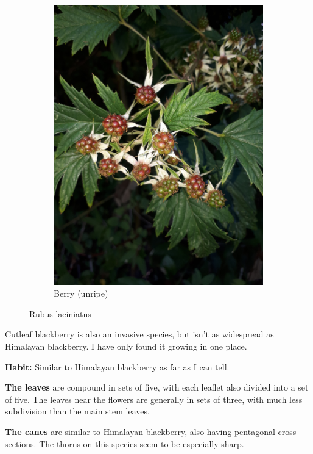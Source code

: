 \begin{figure}
\begin{subfigure}{0.48\textwidth}
    \includegraphics[width=\textwidth]{rubus/laciniatus_berry_01}
    \caption{Berry (unripe)}
    \label{fig:rub:laciniatus:berry}
\end{subfigure}
\caption{Rubus laciniatus}
\label{fig:rub:laciniatus}
\end{figure}

Cutleaf blackberry is also an invasive species, but isn't as widespread as Himalayan blackberry. I have only found it growing in one place.

\textbf{Habit:} Similar to Himalayan blackberry as far as I can tell.

\textbf{The leaves} are compound in sets of five, with each leaflet also divided into a set of five. The leaves near the flowers are generally in sets of three, with much less subdivision than the main stem leaves.

\textbf{The canes} are similar to Himalayan blackberry, also having pentagonal cross sections. The thorns on this species seem to be especially sharp.

